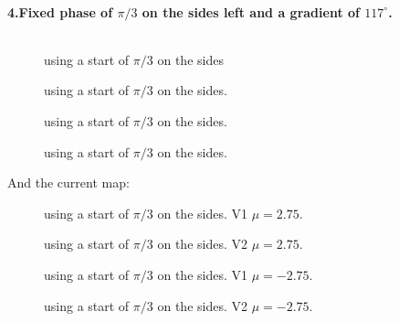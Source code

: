 \documentclass[../main.tex]{subfiles}
\begin{document}
\paragraph{4.Fixed phase of $\pi/3$ on the sides left and a gradient of $117^{\circ}$.}$~$\\
\begin{figure}[H]
    \centering
    
    \caption{using a start of $\pi/3$ on the sides}
\end{figure}
\begin{figure}[H]
    \centering
    
    \caption{using a start of $\pi/3$ on the sides.}
\end{figure}
\begin{figure}[H]
    \centering
    
    \caption{using a start of $\pi/3$ on the sides.}
\end{figure}
\begin{figure}[H]
    \centering
    
    \caption{using a start of $\pi/3$ on the sides.}
\end{figure}

And the current map:
\begin{figure}[H]
    \centering
    
    \caption{using a start of $\pi/3$ on the sides. V1 $\mu = 2.75$.}
\end{figure}
\begin{figure}[H]
    \centering
    
    \caption{using a start of $\pi/3$ on the sides. V2 $\mu = 2.75$.}
\end{figure}

\begin{figure}[H]
    \centering
    
    \caption{using a start of $\pi/3$ on the sides. V1 $\mu = -2.75$.}
\end{figure}
\begin{figure}[H]
    \centering
    
    \caption{using a start of $\pi/3$ on the sides. V2 $\mu = -2.75$.}
\end{figure}
\end{document}
